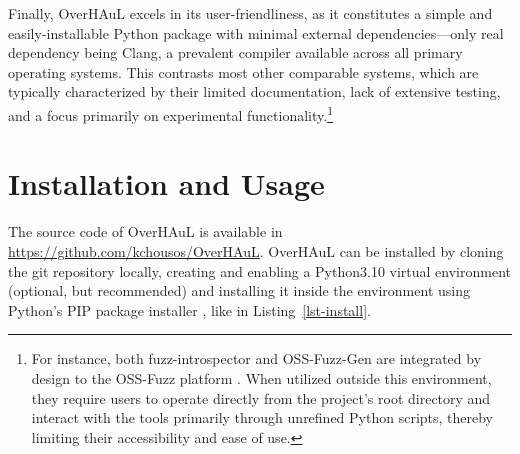 \documentclass[
  a4paper,
]{scrreprt}
\theoremstyle{definition}
\theoremstyle{remark}
\begin{document}
Finally, OverHAuL excels in its user-friendliness, as it constitutes a
simple and easily-installable Python package with minimal external
dependencies---only real dependency being Clang, a prevalent compiler
available across all primary operating systems. This contrasts most
other comparable systems, which are typically characterized by their
limited documentation, lack of extensive testing, and a focus primarily
on experimental functionality.\footnote{For instance, both
  fuzz-introspector and OSS-Fuzz-Gen are integrated by design to the
  OSS-Fuzz platform \autocite{fuzz-introspector,oss-fuzz-gen,oss-fuzz}.
  When utilized outside this environment, they require users to operate
  directly from the project's root directory and interact with the tools
  primarily through unrefined Python scripts, thereby limiting their
  accessibility and ease of use.}

\section{Installation and Usage}\label{sec-install}

The source code of OverHAuL is available in
\url{https://github.com/kchousos/OverHAuL}. OverHAuL can be installed by
cloning the git repository locally, creating and enabling a Python3.10
virtual environment \autocite{venv} (optional, but recommended) and
installing it inside the environment using Python's PIP package
installer \autocite{pip}, like in Listing~\ref{lst-install}.
\end{document}
